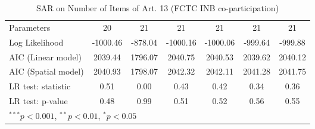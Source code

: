 \begin{table}[!h]
\begin{center}
\begin{tabular}{l c c c c c c }
Parameters              & 20           & 21           & 21           & 21           & 21           & 21           \\
Log Likelihood          & -1000.46     & -878.04      & -1000.16     & -1000.06     & -999.64      & -999.88      \\
AIC (Linear model)      & 2039.44      & 1796.07      & 2040.75      & 2040.53      & 2039.62      & 2040.12      \\
AIC (Spatial model)     & 2040.93      & 1798.07      & 2042.32      & 2042.11      & 2041.28      & 2041.75      \\
LR test: statistic      & 0.51         & 0.00         & 0.43         & 0.42         & 0.34         & 0.36         \\
LR test: p-value        & 0.48         & 0.99         & 0.51         & 0.52         & 0.56         & 0.55         \\
\bottomrule
\multicolumn{7}{l}{\scriptsize{$^{***}p<0.001$, $^{**}p<0.01$, $^*p<0.05$}}
\end{tabular}
\caption{SAR on Number of Items of Art. 13 (FCTC INB co-participation)}
\label{table:coefficients}
\end{center}
\end{table}
